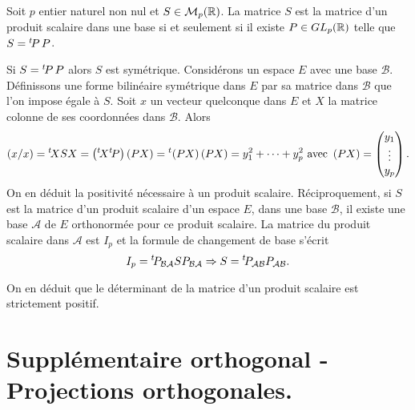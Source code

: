 \begin{prop}
 Soit $p$ entier naturel non nul et $S\in \mathcal M_p(\mathbb{R})$. La matrice $S$ est la matrice d'un produit scalaire dans une base si et seulement si il existe $P\in GL_p(\mathbb{R})$ telle que $S = \mathstrut^t\! P\, P$.
\end{prop}
\begin{demo}
 Si $S = \mathstrut^t\! P\, P$ alors $S$ est symétrique. Considérons un espace $E$ avec une base $\mathcal B$. Définissons une forme bilinéaire symétrique dans $E$ par sa matrice dans $\mathcal{B}$ que l'on impose égale à $S$. Soit $x$ un vecteur quelconque dans $E$ et $X$ la matrice colonne de ses coordonnées dans $\mathcal B$. Alors
\begin{displaymath}
 (x/x) = \mathstrut^t\! X S X = \left( \mathstrut^t\! X \mathstrut^t\! P\right) \left(  P X\right) = \mathstrut^t\! \left(  P X\right)\left(  P X\right)
= y_1^2+\cdots+y_p^2 \text{ avec }
\left(  P X\right)=
\begin{pmatrix}
 y_1\\ \vdots \\ y_p
\end{pmatrix} .
\end{displaymath}
On en déduit la positivité nécessaire à un produit scalaire.\newline
Réciproquement, si $S$ est la matrice d'un produit scalaire d'un espace $E$, dans une base $\mathcal{B}$, il existe une base $\mathcal{A}$ de $E$ orthonormée pour ce produit scalaire. La matrice du produit scalaire dans $\mathcal{A}$ est $I_p$ et la formule de changement de base s'écrit
\begin{displaymath}
 I_p = \mathstrut^t\! P_{\mathcal{B}\mathcal{A}} S P_{\mathcal{B}\mathcal{A}} \Rightarrow
S = \mathstrut^t\! P_{\mathcal{A}\mathcal{B}} P_{\mathcal{A}\mathcal{B}}.
\end{displaymath}
\end{demo}
\begin{rem}
 On en déduit que le déterminant de la matrice d'un produit scalaire est strictement positif.
\end{rem}

\section{Supplémentaire orthogonal - Projections orthogonales.}

